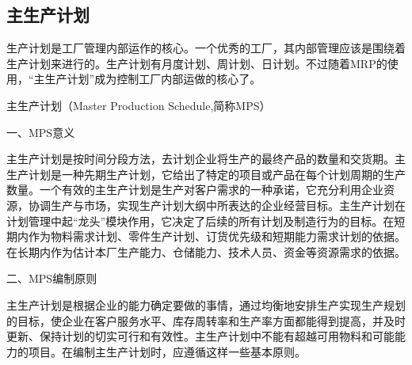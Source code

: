 \subsection {主生产计划}

    生产计划是工厂管理内部运作的核心。一个优秀的工厂，其内部管理应该是围绕着生产计划来进行的。生产计划有月度计划、周计划、日计划。不过随着MRP的使用，“主生产计划”成为控制工厂内部运做的核心了。

    主生产计划（Master Production Schedule,简称MPS）

    一、MPS意义

    主生产计划是按时间分段方法，去计划企业将生产的最终产品的数量和交货期。主生产计划是一种先期生产计划，它给出了特定的项目或产品在每个计划周期的生产数量。一个有效的主生产计划是生产对客户需求的一种承诺，它充分利用企业资源，协调生产与市场，实现生产计划大纲中所表达的企业经营目标。主生产计划在计划管理中起“龙头”模块作用，它决定了后续的所有计划及制造行为的目标。在短期内作为物料需求计划、零件生产计划、订货优先级和短期能力需求计划的依据。在长期内作为估计本厂生产能力、仓储能力、技术人员、资金等资源需求的依据。

    二、MPS编制原则

    主生产计划是根据企业的能力确定要做的事情，通过均衡地安排生产实现生产规划的目标，使企业在客户服务水平、库存周转率和生产率方面都能得到提高，并及时更新、保持计划的切实可行和有效性。主生产计划中不能有超越可用物料和可能能力的项目。在编制主生产计划时，应遵循这样一些基本原则。

